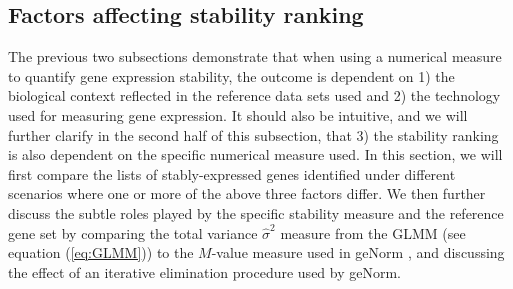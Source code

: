 \documentclass[11pt, a4paper]{article}
\begin{document}
\subsection{Factors affecting stability ranking}\label{section:stabilityMeasure}
The previous two subsections demonstrate that when using a numerical measure
to quantify gene expression stability, the outcome is dependent on 1) the
biological context reflected in the reference data sets used and 2) the
technology used for measuring gene expression. It should also be intuitive,
and we will further clarify in the second half of this subsection, that 3) the
stability ranking is also dependent on the specific numerical measure used.
In this section, we will first compare the lists of stably-expressed genes
identified under different scenarios where one or more of the above three
factors differ.  
We then further discuss the subtle roles played by the specific stability
measure and the reference gene set by comparing
the total variance $\hat\sigma^2$ measure from the GLMM (see equation
(\ref{eq:GLMM})) to the $M$-value measure used in geNorm
\citep{vandesompele2002accurate}, and discussing the effect of an iterative
elimination procedure used by geNorm.
\end{document}
